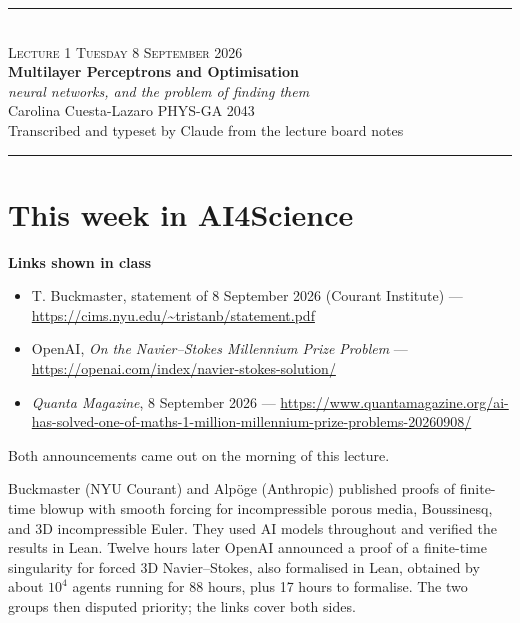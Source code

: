 \documentclass[11pt]{article}
\begin{document}
\begin{center}
{\color{accent}\rule{\textwidth}{1.2pt}}\\[9pt]
{\normalsize\color{accent}\scshape Lecture 1 \;\textbullet\; Tuesday 8 September 2026}\\[8pt]
{\LARGE\bfseries Multilayer Perceptrons and Optimisation}\\[7pt]
{\large\itshape neural networks, and the problem of finding them}\\[9pt]
{\normalsize Carolina Cuesta-Lazaro \;\textbullet\; PHYS-GA 2043}\\[6pt]
{\footnotesize\color{black!60} Transcribed and typeset by Claude from the lecture board notes}\\[8pt]
{\color{accent}\rule{\textwidth}{0.5pt}}
\end{center}

\vspace{0.2em}

\section{This week in AI4Science}

\begin{tcolorbox}[enhanced, colback=white, colframe=rule, boxrule=0.6pt, arc=2pt,
  left=10pt, right=10pt, top=7pt, bottom=7pt]
\small
\textbf{Links shown in class}
\begin{itemize}[leftmargin=1.2em, itemsep=1pt]
  \item T. Buckmaster, statement of 8 September 2026 (Courant Institute) ---
        \url{https://cims.nyu.edu/~tristanb/statement.pdf}
  \item OpenAI, \emph{On the Navier--Stokes Millennium Prize Problem} ---
        \url{https://openai.com/index/navier-stokes-solution/}
  \item \emph{Quanta Magazine}, 8 September 2026 ---
        \url{https://www.quantamagazine.org/ai-has-solved-one-of-maths-1-million-millennium-prize-problems-20260908/}
\end{itemize}
\end{tcolorbox}

\noindent
Both announcements came out on the morning of this lecture.

\medskip
\noindent
Buckmaster (NYU Courant) and Alpöge (Anthropic) published proofs of finite-time blowup
with smooth forcing for incompressible porous media, Boussinesq, and 3D incompressible
Euler. They used AI models throughout and verified the results in Lean. Twelve hours
later OpenAI announced a proof of a finite-time singularity for forced 3D Navier--Stokes,
also formalised in Lean, obtained by about $10^{4}$ agents running for 88 hours, plus 17
hours to formalise. The two groups then disputed priority; the links cover both sides.
\end{document}
